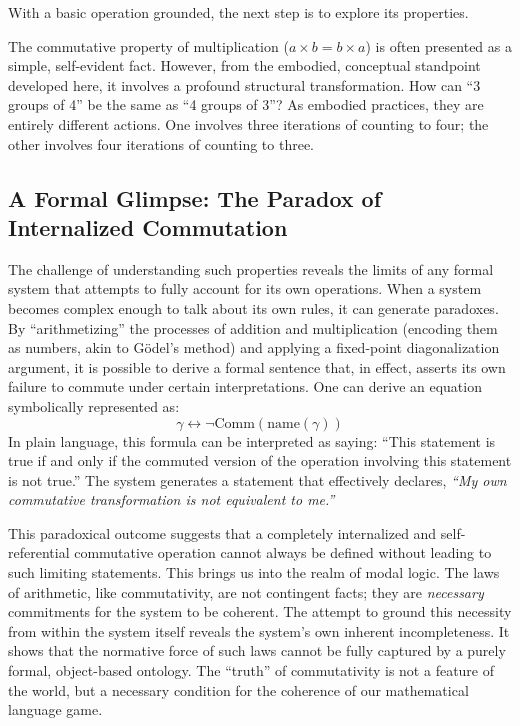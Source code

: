 \documentclass[12pt]{book}
\begin{document}
With a basic operation grounded, the next step is to explore its properties.

The commutative property of multiplication (\(a \times b = b \times a\)) is often presented as a simple, self-evident fact. However, from the embodied, conceptual standpoint developed here, it involves a profound structural transformation. How can ``3 groups of 4'' be the same as ``4 groups of 3''? As embodied practices, they are entirely different actions. One involves three iterations of counting to four; the other involves four iterations of counting to three.

\subsection{A Formal Glimpse: The Paradox of Internalized Commutation}

The challenge of understanding such properties reveals the limits of any formal system that attempts to fully account for its own operations. When a system becomes complex enough to talk about its own rules, it can generate paradoxes. By ``arithmetizing'' the processes of addition and multiplication (encoding them as numbers, akin to Gödel's method) and applying a fixed-point diagonalization argument, it is possible to derive a formal sentence that, in effect, asserts its own failure to commute under certain interpretations. One can derive an equation symbolically represented as:
\begin{equation}
\gamma \leftrightarrow \neg \text{Comm}(\text{name}(\gamma))
\end{equation}
In plain language, this formula can be interpreted as saying: ``This statement is true if and only if the commuted version of the operation involving this statement is not true.'' The system generates a statement that effectively declares, \textit{``My own commutative transformation is not equivalent to me.''}

This paradoxical outcome suggests that a completely internalized and self-referential commutative operation cannot always be defined without leading to such limiting statements. This brings us into the realm of modal logic. The laws of arithmetic, like commutativity, are not contingent facts; they are \textit{necessary} commitments for the system to be coherent. The attempt to ground this necessity from within the system itself reveals the system's own inherent incompleteness. It shows that the normative force of such laws cannot be fully captured by a purely formal, object-based ontology. The ``truth'' of commutativity is not a feature of the world, but a necessary condition for the coherence of our mathematical language game.
\end{document}
